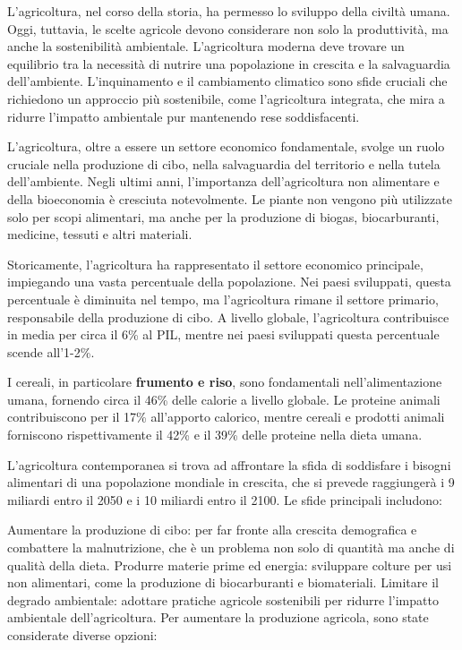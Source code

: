 \documentclass[
]{book}
\theoremstyle{definition}
\theoremstyle{definition}
\theoremstyle{definition}
\theoremstyle{definition}
\theoremstyle{remark}
\begin{document}
L'agricoltura, nel corso della storia, ha permesso lo sviluppo della civiltà umana. Oggi, tuttavia, le scelte agricole devono considerare non solo la produttività, ma anche la sostenibilità ambientale. L'agricoltura moderna deve trovare un equilibrio tra la necessità di nutrire una popolazione in crescita e la salvaguardia dell'ambiente. L'inquinamento e il cambiamento climatico sono sfide cruciali che richiedono un approccio più sostenibile, come l'agricoltura integrata, che mira a ridurre l'impatto ambientale pur mantenendo rese soddisfacenti.

L'agricoltura, oltre a essere un settore economico fondamentale, svolge un ruolo cruciale nella produzione di cibo, nella salvaguardia del territorio e nella tutela dell'ambiente. Negli ultimi anni, l'importanza dell'agricoltura non alimentare e della bioeconomia è cresciuta notevolmente. Le piante non vengono più utilizzate solo per scopi alimentari, ma anche per la produzione di biogas, biocarburanti, medicine, tessuti e altri materiali.

Storicamente, l'agricoltura ha rappresentato il settore economico principale, impiegando una vasta percentuale della popolazione. Nei paesi sviluppati, questa percentuale è diminuita nel tempo, ma l'agricoltura rimane il settore primario, responsabile della produzione di cibo. A livello globale, l'agricoltura contribuisce in media per circa il 6\% al PIL, mentre nei paesi sviluppati questa percentuale scende all'1-2\%.

I cereali, in particolare \textbf{frumento e riso}, sono fondamentali nell'alimentazione umana, fornendo circa il 46\% delle calorie a livello globale. Le proteine animali contribuiscono per il 17\% all'apporto calorico, mentre cereali e prodotti animali forniscono rispettivamente il 42\% e il 39\% delle proteine nella dieta umana.

L'agricoltura contemporanea si trova ad affrontare la sfida di soddisfare i bisogni alimentari di una popolazione mondiale in crescita, che si prevede raggiungerà i 9 miliardi entro il 2050 e i 10 miliardi entro il 2100. Le sfide principali includono:

Aumentare la produzione di cibo: per far fronte alla crescita demografica e combattere la malnutrizione, che è un problema non solo di quantità ma anche di qualità della dieta. Produrre materie prime ed energia: sviluppare colture per usi non alimentari, come la produzione di biocarburanti e biomateriali. Limitare il degrado ambientale: adottare pratiche agricole sostenibili per ridurre l'impatto ambientale dell'agricoltura. Per aumentare la produzione agricola, sono state considerate diverse opzioni:
\end{document}
